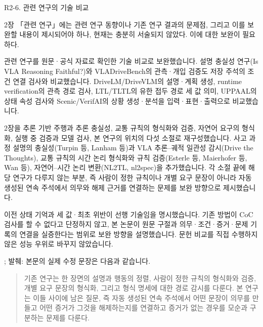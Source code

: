 \begin{reviewitem}{R2-6. 관련 연구의 기술 비교}

\begin{reviewercomment}

2장 「관련 연구」에는 관련 연구 동향이나 기존 연구 결과의 문제점, 그리고 이를 보완할 내용이 제시되어야 하나, 현재는 충분히 서술되지 않았다. 이에 대한 보완이 필요하다.

\end{reviewercomment}

\begin{authorresponse}

관련 연구를 원문·공식 자료로 확인한 기술 비교로 보완했습니다. 설명 충실성 연구(Is VLA Reasoning Faithful?)와 VLADriveBench의 관측·개입 검증도 저장 주석의 조건 연결 검사와 비교했습니다. DriveLM/DriveVLM의 설명·계획 생성, runtime verification의 관측 경로 검사, LTL/TLTL의 유한 접두 경로 세 값 의미, UPPAAL의 상태 속성 검사와 Scenic/VerifAI의 상황 생성·분석을 입력·표현·출력으로 비교했습니다.

2장을 추론 기반 주행과 추론 충실성, 교통 규칙의 형식화와 검증, 자연어 요구의 형식화, 실행 중 검증과 모델 검사, 본 연구의 위치의 다섯 소절로 재구성했습니다. 사고 과정 설명의 충실성(Turpin 등, Lanham 등)과 VLA 추론–궤적 일관성 감시(Drive the Thoughts), 교통 규칙의 시간 논리 형식화와 규칙 검증(Esterle 등, Maierhofer 등, Wan 등), 자연어–시간 논리 변환(NL2TL, nl2spec)을 추가했습니다. 각 소절 끝에 해당 연구가 다루지 않는 부분, 즉 사람이 정한 규칙이나 개별 요구 문장이 아니라 자동 생성된 연속 주석에서 의무와 해제 근거를 연결하는 문제를 보완 방향으로 제시했습니다.

이전 상태 기억과 세 값·최초 위반이 선행 기술임을 명시했습니다. 기존 방법이 CoC 검사를 할 수 없다고 단정하지 않고, 본 논문이 원문 구절과 의무·조건·증거·문제 기록의 연결을 실증한다는 범위로 보완 방향을 설명했습니다. 문헌 비교를 직접 수행하지 않은 성능 우위로 바꾸지 않았습니다.

\end{authorresponse}

\begin{manuscriptrevision}{; 발췌: }
본문의 실제 수정 문장은 다음과 같습니다.

\begin{quote}
기존 연구는 한 장면의 설명과 행동의 정렬, 사람이 정한 규칙의 형식화와 검증, 개별 요구 문장의 형식화, 그리고 형식 명세에 대한 경로 감시를 다룬다. 본 연구는 이들 사이에 남은 질문, 즉 자동 생성된 연속 주석에서 어떤 문장이 의무를 만들고 어떤 증거가 그것을 해제하는지를 연결하고 증거가 없는 경우를 모순과 구분하는 문제를 다룬다.
\end{quote}
\end{manuscriptrevision}

\end{reviewitem}

